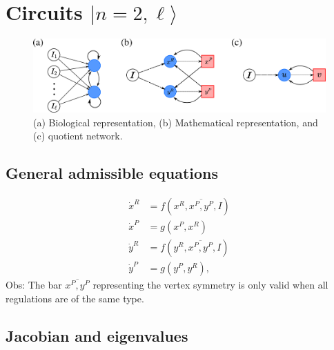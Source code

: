 \documentclass[12pt]{article}
\begin{document}
\section{Circuits $|n = 2, \ell \rangle$}

\begin{figure}[H]
    \centering
    \includegraphics[scale=0.5]{figs/n2l_1.png}
    \caption{(a) Biological representation, 
        (b) Mathematical representation, and (c) quotient
        network.}
    \label{fig:fig3}
\end{figure}

\subsection{General admissible equations}

\begin{equation} \label{eq:n2_gen_eq}
    \begin{aligned}
        \dot{x}^R &= f(x^R, \overline{x^P, y^P}, I)\\
        \dot{x}^P &= g(x^P, x^R)\\
        \dot{y}^R &= f(y^R, \overline{x^P, y^P}, I)\\
        \dot{y}^P &= g(y^P, y^R),
    \end{aligned}
\end{equation}
Obs: The bar $\overline{x^P, y^P}$ representing the vertex 
symmetry is only valid when all regulations are 
of the same type.

\subsection{Jacobian and eigenvalues}
\end{document}
